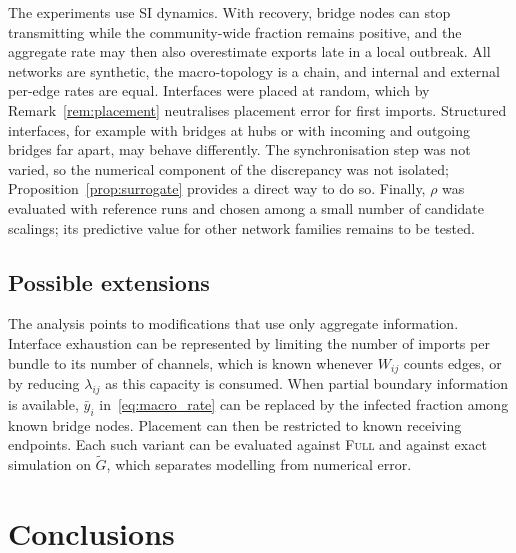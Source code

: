 \documentclass[a4paper,fleqn]{cas-sc}
\newcommand{\ibar}{\bar{y}}
\newcommand{\Full}{\textup{\textsc{Full}}}
\begin{document}
The experiments use SI dynamics. With recovery, bridge nodes can stop transmitting while the community-wide fraction remains positive, and the aggregate rate may then also overestimate exports late in a local outbreak. All networks are synthetic, the macro-topology is a chain, and internal and external per-edge rates are equal. Interfaces were placed at random, which by Remark~\ref{rem:placement} neutralises placement error for first imports. Structured interfaces, for example with bridges at hubs or with incoming and outgoing bridges far apart, may behave differently. The synchronisation step was not varied, so the numerical component of the discrepancy was not isolated; Proposition~\ref{prop:surrogate} provides a direct way to do so. Finally, $\rho$ was evaluated with reference runs and chosen among a small number of candidate scalings; its predictive value for other network families remains to be tested.

\subsection{Possible extensions}

The analysis points to modifications that use only aggregate information. Interface exhaustion can be represented by limiting the number of imports per bundle to its number of channels, which is known whenever $W_{ij}$ counts edges, or by reducing $\lambda_{ij}$ as this capacity is consumed. When partial boundary information is available, $\ibar_i$ in~\eqref{eq:macro_rate} can be replaced by the infected fraction among known bridge nodes. Placement can then be restricted to known receiving endpoints. Each such variant can be evaluated against \Full{} and against exact simulation on $\tilde G$, which separates modelling from numerical error.

\section{Conclusions}
\label{sec:conclusions}
\end{document}
